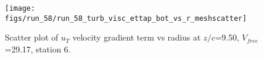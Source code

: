 \begin{figure}[H]
\centering
\texttt{[image: figs/run\_58/run\_58\_turb\_visc\_ettap\_bot\_vs\_r\_meshscatter]}
\caption{Scatter plot of $
u_T$ velocity gradient term vs radius at $z/c$=9.50, $V_{free}$=29.17, station 6.}
\end{figure}


